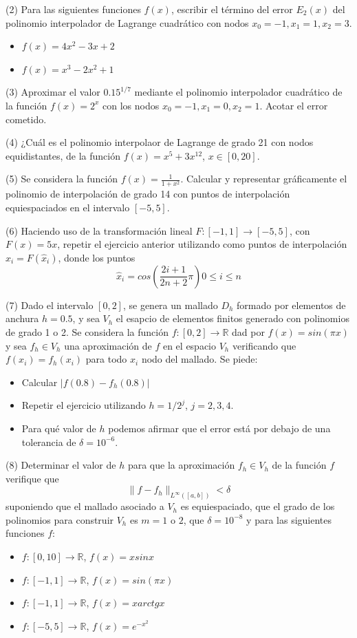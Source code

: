 \noindent (2) Para las siguientes funciones $f(x)$, escribir el término del error $E_2(x)$ del polinomio interpolador de Lagrange cuadrático con nodos $x_0 = -1, x_1 = 1, x_2 = 3$.
\begin{itemize}
    \item $f(x) = 4 x^2 - 3x + 2$
    \item $f(x) = x^3 - 2 x^2 + 1$
\end{itemize}

\noindent (3) Aproximar el valor $0.15^{1/7}$ mediante el polinomio interpolador cuadrático de la función $f(x) = 2^x$ con los nodos $x_0 = -1, x_1 = 0, x_2 = 1$. Acotar el error cometido.

\noindent (4) ¿Cuál es el polinomio interpolaor de Lagrange de grado 21 con nodos equidistantes, de la función $f(x) = x^5 + 3 x^{12}$, $x \in [0, 20]$.

\noindent (5) Se considera la función $f(x) = \frac{1}{1 + x^2}$. Calcular y representar gráficamente el polinomio de interpolación de grado 14 con puntos de interpolación equiespaciados en el intervalo $[-5 , 5]$.

\noindent (6) Haciendo uso de la transformación lineal $F: [-1 , 1] \rightarrow [-5, 5]$, con $F(x) = 5x$, repetir el ejercicio anterior utilizando como puntos de interpolación $x_i = F(\hat{x}_i)$, donde los puntos
\[ \hat{x}_i = cos\left( \frac{2i + 1}{2n + 2} \pi \right) 0 \leq i \leq n \]

\noindent (7) Dado el intervalo $[0, 2]$, se genera un mallado $D_h$ formado por elementos de anchura $h = 0.5$, y sea $V_h$ el esapcio de elementos finitos generado con polinomios de grado 1 o 2. Se considera la función $f: [0, 2] \rightarrow \mathbb{R}$ dad por $f(x) = sin(\pi x)$ y sea $f_h \in V_h$ una aproximación de $f$ en el espacio $V_h$ verificando que $f(x_i) = f_h (x_i)$ para todo $x_i$ nodo del mallado. Se piede:
\begin{itemize}
    \item Calcular $|f(0.8) - f_h(0.8)|$
    \item Repetir el ejercicio utilizando $h = 1/2^j$, $j = 2, 3, 4$.
    \item Para qué valor de $h$ podemos afirmar que el error está por debajo de una tolerancia de $\delta = 10^{-6}$.
\end{itemize}

\noindent (8) Determinar el valor de $h$ para que la aproximación $f_h \in V_h$ de la función $f$ verifique que 
\[ \|f - f_h\|_{L^\infty ([a, b])} < \delta \]
suponiendo que el mallado asociado a $V_h$ es equiespaciado, que el grado de los polinomios para construir $V_h$ es $m = 1$ o $2$, que $\delta = 10^{-8}$ y para las siguientes funciones $f$:
\begin{itemize}
    \item $f:[0, 10] \rightarrow \mathbb{R}$, $f(x) = x sin x$
    \item $f:[-1, 1] \rightarrow \mathbb{R}$, $f(x) = sin(\pi x)$
    \item $f:[-1, 1] \rightarrow \mathbb{R}$, $f(x) = x arctg x$
    \item $f:[-5, 5] \rightarrow \mathbb{R}$, $f(x) = e^{-x^2}$
\end{itemize}
